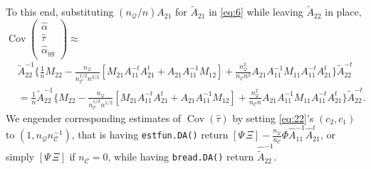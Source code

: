 \documentclass{article}
\begin{document}
To this end, substituting $(n_{\mathcal{Q}}/n)A_{21}$ for $\tilde{A}_{21}$ in \eqref{eq:6} while leaving
$\tilde{A}_{22}$ in place, $\operatorname{Cov}\left(\begin{smallmatrix}\hat\alpha \\ \hat\tau \\ \hat{\alpha}_{yg}\end{smallmatrix}\right) \approx$
  \begin{align*}
  &\tilde{A}_{22}^{-1}\{\frac{1}{n} M_{22} -
                                 \frac{n_{\mathcal{Q}}}{n_{\mathcal{C}}^{1/2}n^{3/2}}[M_{21}A_{11}^{-t}A_{21}^t
                                 + A_{21}A_{11}^{-1}M_{12}] +
                                 \frac{n_{\mathcal{Q}}^{2}}{n_{\mathcal{C}}n^{2}}A_{21}A_{11}^{-1}M_{11}A_{11}^{-t}A_{21}^{t}\}\tilde{A}_{22}^{-t}\nonumber
    \\
  &= \frac{1}{n}\tilde{A}_{22}^{-1}\{M_{22} -
                                 \frac{n_{\mathcal{Q}}}{n_{\mathcal{C}}^{1/2}n^{1/2}}[M_{21}A_{11}^{-t}A_{21}^t
                                 + A_{21}A_{11}^{-1}M_{12}] +
                                 \frac{n_{\mathcal{Q}}^{2}}{n_{\mathcal{C}}n}A_{21}A_{11}^{-1}M_{11}A_{11}^{-t}A_{21}^{t}\}\tilde{A}_{22}^{-t} .\nonumber
  \end{align*}
 We engender corresponding estimates of $\operatorname{Cov}(\hat\tau)$ by setting \eqref{eq:22}'s
 $(c_{2}, c_{1})$ to $(1, n_{\mathcal{Q}}n_{\mathcal{C}}^{-1})$, that is having
 \texttt{estfun.DA()} return $[\Psi\, \Xi] - 
 \frac{n_{\mathcal{Q}}}{n_{\mathcal{C}}}\Phi
 \hat{A}_{11}^{-1}\hat{A}_{21}^{t}$, or simply $[\Psi\, \Xi]$ if $n_{\mathcal{C}}=0$, while having \texttt{bread.DA()}
 return $\hat{\tilde{A}}_{22}^{-1}$.
\end{document}
